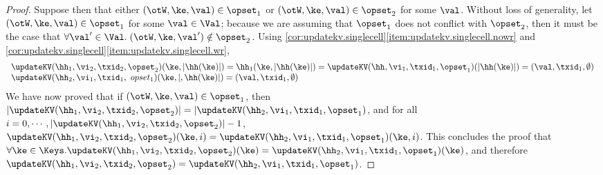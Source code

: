 \begin{proof}
Suppose then that  either $(\otW, \ke, \val) \in \opset_1$ or $(\otW,\ke, \val) \in \opset_2$ 
for some $\val$. Without loss of generality, let $(\otW,\ke,\val) \in \opset_1$ for some $\val \in \Val$; 
because we are assuming that $\opset_1$ does not conflict with $\opset_2$, then 
it must be the case that $\forall \val' \in \Val.\;(\otW,\ke,\val') \notin \opset_2$. 
Using \cref{cor:updatekv.singlecell}\eqref{item:updatekv.singlecell.nowr} and 
\cref{cor:updatekv.singlecell}\eqref{item:updatekv.singlecell.wr}, 
\[
\begin{array}{l}
\updateKV(\hh_1, \vi_2, \txid_2, \opset_2)(\ke, \lvert \hh(\ke) \rvert) = 
\hh_1(\ke, \lvert \hh(\ke) \rvert) = \updateKV(\hh, \vi_1, \txid_1, \opset_1)(\lvert \hh(\ke) \rvert) = (\val, \txid_1, \emptyset)\\
\updateKV(\hh_2, \vi_1, \txid_1,\ opset_1)(\ke, \lvert, \hh(\ke) \rvert) = (\val, \txid_1, \emptyset)
\end{array}
\]
We have now proved that if $(\otW,\ke,\val) \in \opset_1$, then $\lvert \updateKV(\hh_1, \vi_2, \txid_2, \opset_2) \rvert = 
\lvert \updateKV(\hh_2, \vi_1, \txid_1, \opset_1)$, and for all 
$i=0,\cdots, \lvert \updateKV(\hh_1, \vi_2, \txid_2, \opset_2) \rvert - 1$, 
$\updateKV(\hh_1,\vi_2, \txid_2, \opset_2)(\ke, i) = \updateKV(\hh_2, \vi_1, \txid_1, \opset_1)(\ke, i)$. 
This concludes the proof that $\forall \ke \in \Keys.\updateKV(\hh_1,\vi_2,\txid_2,\opset_2)(\ke) = 
\updateKV(\hh_2,\vi_1,\txid_1,\opset_1)(\ke)$, and therefore 
$\updateKV(\hh_1, \vi_2, \txid_2, \opset_2) = \updateKV(\hh_2, \vi_1,\txid_1,\opset_1)$.
\end{proof}
%
%
